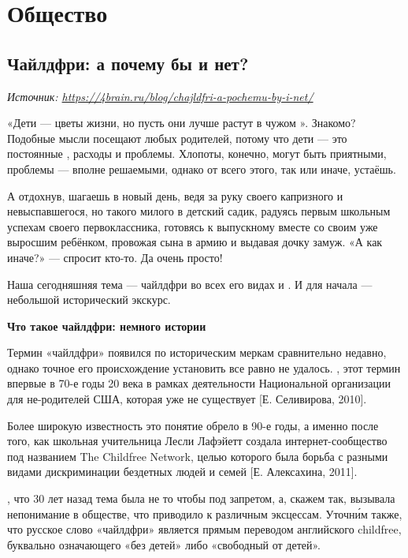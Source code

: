 \chapter{Общество}

\section{Чайлдфри: а почему бы и нет?}

\textit{Источник: \url{https://4brain.ru/blog/chajldfri-a-pochemu-by-i-net/}}

«Дети --- цветы жизни, но пусть они лучше растут в чужом ». Знакомо? Подобные мысли посещают  любых родителей, потому что дети --- это постоянные , расходы и проблемы. Хлопоты, конечно, могут быть приятными, проблемы --- вполне решаемыми, однако от всего этого, так или иначе, устаёшь.

А отдохнув, шагаешь в новый день, ведя за руку своего капризного и невыспавшегося, но такого милого  в детский садик, радуясь первым школьным успехам своего первоклассника, готовясь к выпускному вместе со своим уже выросшим ребёнком, провожая сына в армию и выдавая дочку замуж. «А как иначе?» --- спросит кто-то. Да очень просто!

Наша сегодняшняя тема --- чайлдфри во всех его видах и . И для начала --- небольшой исторический экскурс.

\textbf{Что такое чайлдфри: немного истории}

Термин «чайлдфри» появился по историческим меркам сравнительно недавно, однако точное его происхождение установить все равно не удалось. , этот термин впервые  в 70-е годы 20 века в рамках деятельности Национальной организации для не-родителей США, которая  уже не существует [Е. Селивирова, 2010].

Более широкую известность это понятие обрело в 90-е годы, а именно после того, как школьная учительница Лесли Лафэйетт создала интернет-сообщество под названием The Childfree Network, целью которого была борьба с разными видами дискриминации бездетных людей и семей [Е. Алексахина, 2011].

, что 30 лет назад тема была не то чтобы под запретом, а, скажем так, вызывала непонимание в обществе, что приводило к различным эксцессам. Уточн\'{и}м также, что русское слово «чайлдфри» является прямым переводом английского childfree, буквально означающего «без детей» либо «свободный от детей».

